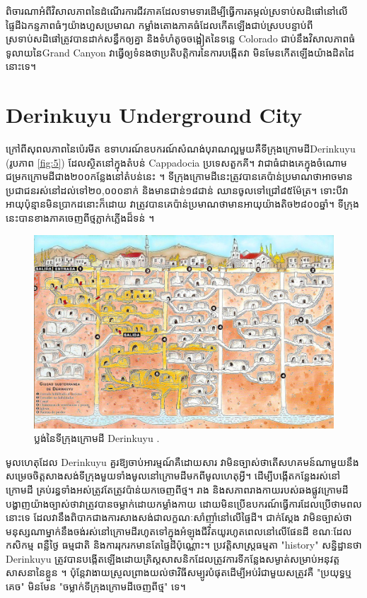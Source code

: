 \documentclass[10pt,twocolumn,letterpaper]{article}
\begin{document}
ពិចារណាអំពីវិសាលភាពនៃដំណើរការជីវភាគដែលទាមទារដើម្បីធ្វើការតម្កល់ស្រទាប់សដិផៅនៅលើផ្ទៃដីឯកន្ទភាពធំៗយ៉ាងហួសប្រមាណ កម្លាំងតោងភាគធំដែលកើតឡើងជាប់ស្របបន្ទាប់ពីស្រទាប់សដិផៅត្រូវបានដាក់សន្ធឹកឲ្យគ្នា និងទំហំតូចចង្អៀតនៃទន្លេ Colorado ជាប់នឹងវិសាលភាពធំទូលាយនៃGrand Canyon វាធ្វើឲ្យទំនងថាប្រតិបត្តិការ​នៃការបង្កើតវា មិនមែនកើតឡើងយ៉ាងដិតដៃនោះទេ។

\section{Derinkuyu Underground City}

ក្រៅពីសុពលភាពនៃប៉េរមីត ឧទាហរណ៍ឧបករណ៍សំណង់បុរាណល្អមួយគឺទីក្រុងក្រោមដីDerinkuyu (រូបភាព \ref{fig:5}) ដែលស្ថិតនៅក្នុងតំបន់ Cappadocia ប្រទេសតួកគី។ វាជាធំជាងគេក្នុងចំណោមជម្រកក្រោមដីជាង២០០កន្លែងនៅតំបន់នេះ \cite{54}។ ទីក្រុងក្រោមដីនេះត្រូវបានគេប៉ាន់ប្រមាណថាអាចមានប្រជាជនរស់នៅដល់ទៅ២០,០០០នាក់ និងមានជាន់១៨ជាន់ ឈានចូលទៅជ្រៅ៨៥ម៉ែត្រ។ ទោះបីវាអាយុប៉ុន្មានមិនប្រាកដនោះក៏ដោយ វាត្រូវបានគេប៉ាន់ប្រមាណថាមានអាយុយ៉ាងតិច២៨០០ឆ្នាំ។ ទីក្រុងនេះបានខាងភាគចេញពីថ្មភ្លាក់ភ្លើងដ៏ទន់ \cite{52, 53}។

\begin{figure}[b]
\begin{center}

   \includegraphics[width=1\linewidth]{derinkuyu.jpeg}
\end{center}
   \caption{ប្លង់នៃទីក្រុងក្រោមដី Derinkuyu \cite{56}.}
\label{fig:5}
\label{fig:onecol}
\end{figure}

មូលហេតុដែល Derinkuyu គួរឱ្យចាប់អារម្មណ៍គឺដោយសារ វាមិនច្បាស់ថាតើ​សហគមន៍ណាមួយនឹងសម្រេចចិត្តសាងសង់ទីក្រុងមួយទាំងមូលនៅក្រោមដីមកពីមូលហេតុអ្វី។ ដើម្បីបង្កើតកន្លែងរស់នៅក្រោមដី គ្រប់រន្ធទាំងអស់ត្រូវតែត្រូវប៉ាន់យកចេញពីថ្ម។ រាង និងសភាពរាងកាយរបស់ឆងផ្លូវក្រោមដីបង្ហាញយ៉ាងច្បាស់ថាវាត្រូវបានចម្លាក់ដោយកម្លាំងកាយ ដោយមិនប្រើឧបករណ៍ធ្វើការដែលប្រើថាមពលនោះទេ ដែលវានឹងពិបាកជាងការសាងសង់ជាលក្ខណៈសាំញ៉ាំនៅលើផ្ទៃដី។ ជាក់ស្តែង វាមិនច្បាស់ថាមនុស្សណាម្នាក់នឹងចង់រស់នៅក្រោមដីរហូតទៅក្នុងអំឡុងជីវិតយូរហូតពេលនៅលើផែនដី ខណៈដែលកសិកម្ម ពន្លឺថ្ងៃ ធម្មជាតិ និងការរុករកមានតែផ្ទៃដីប៉ុណ្ណោះ។ ប្រវត្តិសាស្ត្រធម្មតា "history" សន្និដ្ឋានថា Derinkuyu ត្រូវបានបង្កើតឡើងដោយគ្រិស្ដសាសនិកដែលត្រូវការទីកន្លែងសម្ងាត់សម្រាប់អនុវត្តសាសនានៃខ្លួន \cite{53}។ ប៉ុន្តែវាងាយស្រួលព្រាងយល់ថាវិធីសម្បូរបំផុតដើម្បីអប់រំជាមួយសត្រូវគឺ "ប្រយុទ្ធឬគេច" មិនមែន "ចម្លាក់ទីក្រុងក្រោមដីចេញពីថ្ម" ទេ។
\end{document}
